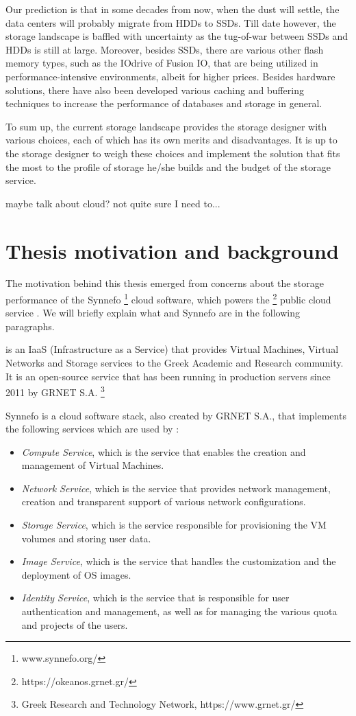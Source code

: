 Our prediction is that in some decades from now, when the dust will settle, the 
data centers will probably migrate from HDDs to SSDs. Till date however, the 
storage landscape is baffled with uncertainty as the tug-of-war between SSDs 
and HDDs is still at large. Moreover, besides SSDs, there are various other 
flash memory types, such as the IOdrive of Fusion IO, that are being utilized 
in performance-intensive environments, albeit for higher prices. Besides 
hardware solutions, there have also been developed various caching and 
buffering techniques to increase the performance of databases and storage in 
general.

To sum up, the current storage landscape provides the storage designer with 
various choices, each of which has its own merits and disadvantages. It is up 
to the storage designer to weigh these choices and implement the solution that 
fits the most to the profile of storage he/she builds and the budget of the 
storage service.

\todo maybe talk about cloud? not quite sure I need to...

\section{Thesis motivation and background}

The motivation behind this thesis emerged from concerns about the storage 
performance of the Synnefo
\footnote{www.synnefo.org/} cloud software, which powers the \okeanos
\footnote{https://okeanos.grnet.gr/} public cloud service \cite{okeanos}. We 
will briefly explain what \okeanos and Synnefo are in the following paragraphs.

\okeanos is an IaaS (Infrastructure as a Service) that provides Virtual 
Machines, Virtual Networks and Storage services to the Greek Academic and 
Research community. It is an open-source service that has been running in 
production servers since 2011 by GRNET S.A.
\footnote{Greek Research and Technology Network, https://www.grnet.gr/}

Synnefo\cite{synnefo} is a cloud software stack, also created by GRNET S.A., 
that implements the following services which are used by \okeanos:

\begin{itemize}
	\item \textit{Compute Service}, which is the service that enables the 
		creation and management of Virtual Machines.
	\item \textit{Network Service}, which is the service that provides network 
		management, creation and transparent support of various network 
		configurations.
	\item \textit{Storage Service}, which is the service responsible for 
		provisioning the VM volumes and storing user data.
	\item \textit{Image Service}, which is the service that handles the 
		customization and the deployment of OS images.
	\item \textit{Identity Service}, which is the service that is responsible 
		for user authentication and management, as well as for managing the 
		various quota and projects of the users.
\end{itemize}

